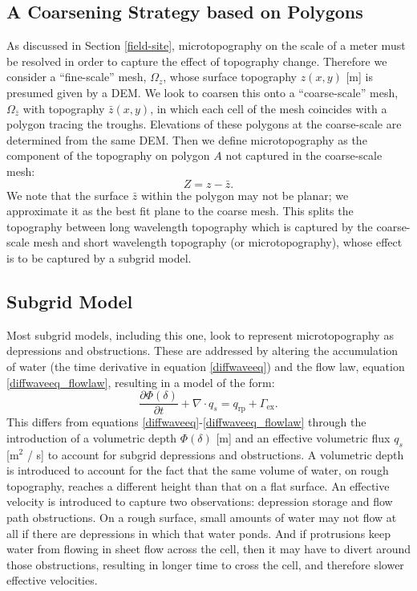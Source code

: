 \documentclass[review,11pt]{elsarticle}
\begin{document}
\subsection{A Coarsening Strategy based on Polygons}
As discussed in Section \ref{field-site}, microtopography on the scale of a meter must be resolved in order to capture the effect of topography change.
Therefore we consider a ``fine-scale'' mesh, $\Omega_z$, whose surface topography $z(x,y)$ [m] is presumed given by a DEM.
We look to coarsen this onto a ``coarse-scale'' mesh, $\Omega_{\bar{z}}$ with topography $\bar{z}(x,y)$, in which each cell of the mesh coincides with a polygon tracing the troughs.
Elevations of these polygons at the coarse-scale are determined from the same DEM.
Then we define microtopography as the component of the topography on polygon $A$ not captured in the coarse-scale mesh:
%
\begin{equation}\label{local_topography}
  Z = z - \bar{z}.
\end{equation}
%
We note that the surface $\bar{z}$ within the polygon may not be planar; we approximate it as the best fit plane to the coarse mesh.
This splits the topography between long wavelength topography which is captured by the coarse-scale mesh and short wavelength topography (or microtopography), whose effect is to be captured by a subgrid model.

%
\subsection{Subgrid Model}\label{subgridmodel}
Most subgrid models, including this one, look to represent microtopography as depressions and obstructions.
These are addressed by altering the accumulation of water (the time derivative in equation \ref{diffwaveeq}) and the flow law, equation \ref{diffwaveeq_flowlaw}, resulting in a model of the form:
%
\begin{equation}\label{subgrid}
\frac{\partial \Phi (\delta)}{\partial t} + \nabla \cdot q_s = q_\text{rp} + \Gamma_\text{ex}.
\end{equation}
%
This differs from equations \ref{diffwaveeq}-\ref{diffwaveeq_flowlaw} through the introduction of a volumetric depth $\Phi(\delta)$ [m] and an effective volumetric flux $q_s$ [m$^2$ / s] to account for subgrid depressions and obstructions.
A volumetric depth is introduced to account for the fact that the same volume of water, on rough topography, reaches a different height than that on a flat surface.
An effective velocity is introduced to capture two observations: depression storage and flow path obstructions.
On a rough surface, small amounts of water may not flow at all if there are depressions in which that water ponds.
And if protrusions keep water from flowing in sheet flow across the cell, then it may have to divert around those obstructions, resulting in longer time to cross the cell, and therefore slower effective velocities.
\end{document}
